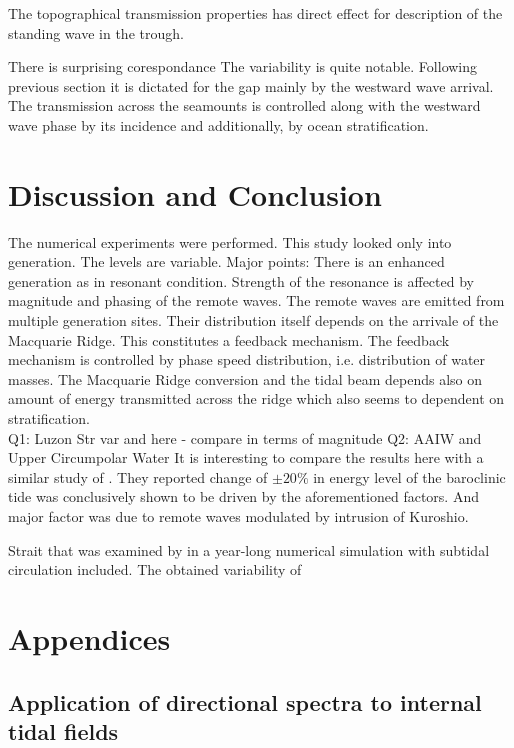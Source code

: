 \documentclass[12pt]{article}
\begin{document}
The topographical transmission properties has direct effect for description of the standing wave in 
the trough. 

There is surprising corespondance The variability is quite notable. Following 
previous section 
it is dictated for 
the gap mainly by the westward wave arrival. The transmission across the seamounts is controlled 
along with the westward wave phase by its incidence and additionally, by ocean stratification.\\

\section{Discussion and Conclusion}
The numerical experiments were performed. This study looked only into generation. The levels are 
variable.
Major points:
There is an enhanced generation as in resonant condition. Strength of the resonance is affected by 
magnitude and phasing of the remote waves. The remote waves are emitted from multiple generation 
sites. Their distribution itself depends on the arrivale of the Macquarie Ridge. This constitutes a 
feedback mechanism. The feedback mechanism is controlled by phase speed distribution, i.e. 
distribution of water masses. The Macquarie Ridge conversion and the tidal beam depends also on 
amount of energy transmitted across the ridge which also seems to dependent on stratification.\\
Q1: Luzon Str var and here - compare in terms of magnitude
Q2: AAIW and Upper Circumpolar Water
It is interesting to compare the results here with a similar study of \citep{kerry2014impact}. They 
reported change of $\pm 20\%$ in energy level of the baroclinic tide was conclusively shown to be 
driven by the aforementioned factors. And major factor was due to remote waves modulated by 
intrusion of Kuroshio. 

Strait that was examined by  in a year-long numerical simulation with 
subtidal circulation included. The obtained variability of 

\section*{Appendices}

\renewcommand{\thesubsection}{\Alph{subsection}}
\setcounter{subsection}{0}
\subsection{Application of directional spectra to internal tidal fields}
\end{document}
